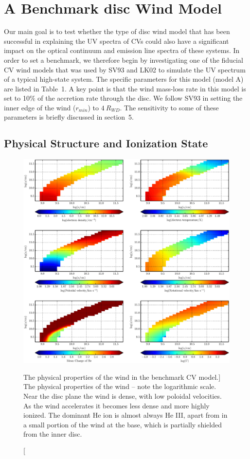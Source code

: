 \nocite{walker1963}

\section{A Benchmark disc Wind Model}
\label{modela}

Our main goal is to test whether the type of disc wind model that has
been successful in explaining the UV spectra of CVs could also have a
significant impact on the optical continuum and emission line spectra
of these systems. In order to set a benchmark, we therefore begin by
investigating one of the fiducial CV wind models that was used by SV93
and LK02 to simulate the UV spectrum of a typical high-state
system. The specific parameters for this model (model A) are listed in
Table~1. A key point is that the wind mass-loss rate in this model is
set to 10$\%$ of the accretion rate through the disc. We follow SV93
in setting the inner edge of the wind ($r_{min}$) to $4~R_{WD}$. 
The sensitivity to some of these parameters is briefly discussed in
section~5. 

\subsection{Physical Structure and Ionization State}
\label{modela_ionization}

\begin{figure}
\includegraphics[width=1.0\textwidth]{figures/05-cvpaper/fig5.eps}
\caption
[The physical properties of the wind in the benchmark CV model.]
{
The physical properties of the wind -- note the logarithmic scale. 
Near the disc plane the wind is dense, with low poloidal velocities.
As the wind accelerates it becomes less dense
and more highly ionized. The dominant He ion
is almost always He III, apart from in a small
portion of the wind at the base, which is partially shielded
from the inner disc.
}
\label{wind}
\end{figure}

